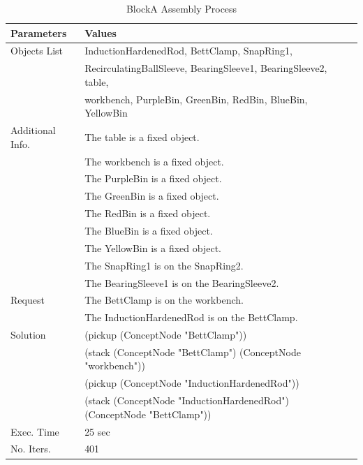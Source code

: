 \begin{table}[htbp]
  \centering
  \caption{BlockA Assembly Process}\label{tab:ass_A_1}
  \medskip
\renewcommand\arraystretch{1}
\renewcommand\tabcolsep{5pt}
\begin{tabular}{ll}
\toprule
\textbf{Parameters} &  \textbf{Values}  \\
\midrule
\rowcolor{gray!25}
Objects List &  InductionHardenedRod, BettClamp, SnapRing1, \\
\rowcolor{gray!25}
& RecirculatingBallSleeve, BearingSleeve1, BearingSleeve2, table, \\
\rowcolor{gray!25}
& workbench, PurpleBin, GreenBin, RedBin, BlueBin, YellowBin \\
Additional Info. & The table is a fixed object. \\
& The workbench is a fixed object. \\
& The PurpleBin is a fixed object. \\
& The GreenBin is a fixed object. \\
& The RedBin is a fixed object. \\
& The BlueBin is a fixed object. \\
& The YellowBin is a fixed object. \\
& The SnapRing1 is on the SnapRing2. \\
& The BearingSleeve1 is on the BearingSleeve2. \\
\rowcolor{gray!25}
Request & The BettClamp is on the workbench. \\
\rowcolor{gray!25}
& The InductionHardenedRod is on the BettClamp. \\
Solution & (pickup (ConceptNode "BettClamp")) \\
& (stack (ConceptNode "BettClamp") (ConceptNode "workbench")) \\
& (pickup (ConceptNode "InductionHardenedRod")) \\
& (stack (ConceptNode "InductionHardenedRod") (ConceptNode "BettClamp")) \\
\rowcolor{gray!25}
Exec. Time & 25 sec \\
No. Iters. & 401 \\	
\bottomrule
\end{tabular}
\end{table}

